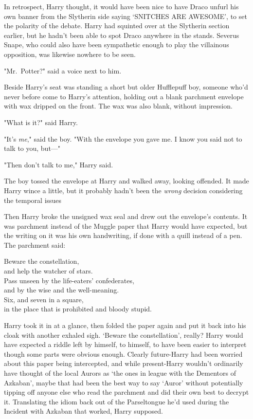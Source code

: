 In retrospect, Harry thought, it would have been nice to have Draco unfurl his
own banner from the Slytherin side saying `SNITCHES ARE AWESOME', to set the
polarity of the debate. Harry had squinted over at the Slytherin section
earlier, but he hadn't been able to spot Draco anywhere in the stands. Severus
Snape, who could also have been sympathetic enough to play the villainous
opposition, was likewise nowhere to be seen.

"Mr.~Potter?" said a voice next to him.

Beside Harry's seat was standing a short but older Hufflepuff boy, someone
who'd never before come to Harry's attention, holding out a blank parchment
envelope with wax dripped on the front. The wax was also blank, without
impression.

"What is it?" said Harry.

"It's \emph{me}," said the boy. "With the envelope you gave me. I know you said
not to talk to you, but\mbox{---}"

"Then don't talk to me," Harry said.

The boy tossed the envelope at Harry and walked away, looking offended. It made
Harry wince a little, but it probably hadn't been the \emph{wrong} decision
considering the temporal issues{\el}

Then Harry broke the unsigned wax seal and drew out the envelope's contents. It
was parchment instead of the Muggle paper that Harry would have expected, but
the writing on it was his own handwriting, if done with a quill instead of a
pen. The parchment said:

\begin{writtenNote}
Beware the constellation,\\
and help the watcher of stars.\\
Pass unseen by the life-eaters' confederates,\\
and by the wise and the well-meaning.\\
Six, and seven in a square,\\
in the place that is prohibited and bloody stupid.
\end{writtenNote}

Harry took it in at a glance, then folded the paper again and put it back into
his cloak with another exhaled sigh. `Beware the constellation', really? Harry
would have expected a riddle left by himself, to himself, to have been easier
to interpret{\el} though some parts were obvious enough. Clearly
future-Harry had been worried about this paper being intercepted, and while
present-Harry wouldn't ordinarily have thought of the local Aurors as `the ones
in league with the Dementors of Azkaban', maybe that had been the best way to
say `Auror' without potentially tipping off anyone else who read the parchment
and did their own best to decrypt it. Translating the idiom back out of the
Parseltongue he'd used during the Incident with Azkaban{\el} that worked,
Harry supposed.

